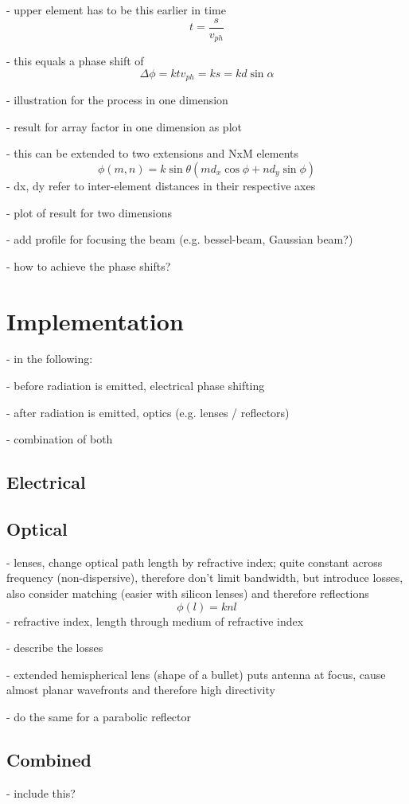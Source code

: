 \documentclass[]{report}
\begin{document}
- upper element has to be this earlier in time
\begin{equation}
	t = \frac{s}{v_{ph}}
\end{equation}

- this equals a phase shift of
\begin{equation}
	\Delta \phi = k t v_{ph} = k s = k d\sin\alpha
\end{equation}

- illustration for the process in one dimension

- result for array factor in one dimension as plot

- this can be extended to two extensions and NxM elements
\begin{equation}
	\phi(m,n) = k\sin\theta(md_x\cos\phi + nd_y\sin\phi)
\end{equation}
- dx, dy refer to inter-element distances in their respective axes

- plot of result for two dimensions

- add profile for focusing the beam (e.g. bessel-beam, Gaussian beam?)

- how to achieve the phase shifts?

\section{Implementation}

- in the following:

- before radiation is emitted, electrical phase shifting

- after radiation is emitted, optics (e.g. lenses / reflectors)

- combination of both

\subsection{Electrical}

\subsection{Optical}

- lenses, change optical path length by refractive index; quite constant across frequency (non-dispersive), therefore don't limit bandwidth, but introduce losses, also consider matching (easier with silicon lenses) and therefore reflections
\begin{equation}
	\phi(l) = knl
\end{equation}
- refractive index, length through medium of refractive index

- describe the losses

- extended hemispherical lens (shape of a bullet) puts antenna at focus, cause almost planar wavefronts and therefore high directivity

- do the same for a parabolic reflector

\subsection{Combined}

- include this?
\end{document}
